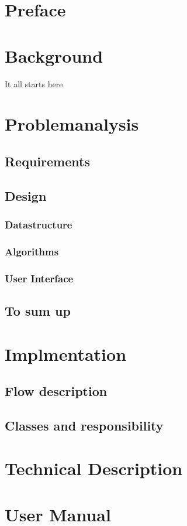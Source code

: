 \documentclass[a4paper,10pt,titlepage]{article}
\begin{document}
	
	\tableofcontents
	\newpage
	\section{Preface}
	\section{Background}
		It all starts here
	\section{Problemanalysis}
		\subsection{Requirements}
		
		\subsection{Design}
			
			\subsubsection{Datastructure}
				
			\subsubsection{Algorithms}
				
			\subsubsection{User Interface}
				
		\subsection{To sum up}
			
	\section{Implmentation}
		\subsection{Flow description}
		\subsection{Classes and responsibility}
		
		\section{Technical Description}
		
	\section{User Manual}
		
				
		
	\section{}
\end{document}

